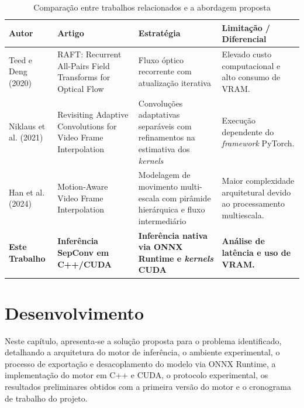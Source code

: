 \documentclass[
    12pt,                %
    openright,           %
    oneside,             %
    a4paper,             %
    english,             %
    brazil               %
]{abntex2}
\begin{document}
\begin{table}[htb]
    \centering
    \caption{Comparação entre trabalhos relacionados e a abordagem proposta}
    \label{tab:trabalhos_relacionados}
    \begin{tabularx}{\textwidth}{X|X|X|X}
        \toprule
        \textbf{Autor} & \textbf{Artigo} & \textbf{Estratégia} & \textbf{Limitação / Diferencial} \\
        \midrule
        Teed e Deng (2020) & RAFT: Recurrent All-Pairs Field Transforms for Optical Flow & Fluxo óptico recorrente com atualização iterativa & Elevado custo computacional e alto consumo de VRAM. \\
        \midrule
        Niklaus et al. (2021) & Revisiting Adaptive Convolutions for Video Frame Interpolation & Convoluções adaptativas separáveis com refinamentos na estimativa dos \textit{kernels} & Execução dependente do \textit{framework} PyTorch. \\
        \midrule
        Han et al. (2024) & Motion-Aware Video Frame Interpolation & Modelagem de movimento multi-escala com pirâmide hierárquica e fluxo intermediário & Maior complexidade arquitetural devido ao processamento multiescala. \\
        \midrule
        \rowcolor{senacblue!15}
        \textbf{Este Trabalho} & \textbf{Inferência SepConv em C++/CUDA} & \textbf{Inferência nativa via ONNX Runtime e \textit{kernels} CUDA} & \textbf{Análise de latência e uso de VRAM.} \\
        \bottomrule
    \end{tabularx}
\end{table}

\chapter{Desenvolvimento}
\label{cap:desenvolvimento}

Neste capítulo, apresenta-se a solução proposta para o problema identificado, detalhando a arquitetura do motor de inferência, o ambiente experimental, o processo de exportação e desacoplamento do modelo via ONNX Runtime, a implementação do motor em C++ e CUDA, o protocolo experimental, os resultados preliminares obtidos com a primeira versão do motor e o cronograma de trabalho do projeto.
\end{document}
